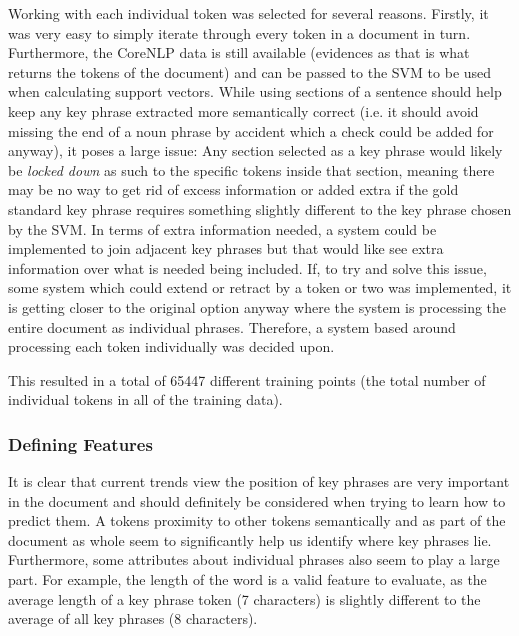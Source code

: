 Working with each individual token was selected for several reasons. Firstly, it was very easy to simply iterate through every token in a document in turn. Furthermore, the CoreNLP data is still available (evidences as that is what returns the tokens of the document) and can be passed to the SVM to be used when calculating support vectors. While using sections of a sentence should help keep any key phrase extracted more semantically correct (i.e. it should avoid missing the end of a noun phrase by accident which a check could be added for anyway), it poses a large issue: Any section selected as a key phrase would likely be \textit{locked down} as such to the specific tokens inside that section, meaning there may be no way to get rid of excess information or added extra if the gold standard key phrase requires something slightly different to the key phrase chosen by the SVM. In terms of extra information needed, a system could be implemented to join adjacent key phrases but that would like see extra information over what is needed being included. If, to try and solve this issue, some system which could extend or retract by a token or two was implemented, it is getting closer to the original option anyway where the system is processing the entire document as individual phrases. Therefore, a system based around processing each token individually was decided upon.

This resulted in a total of 65447 different training points (the total number of individual tokens in all of the training data).

\subsubsection*{Defining Features}
It is clear that current trends view the position of key phrases are very important in the document and should definitely be considered when trying to learn how to predict them. A tokens proximity to other tokens semantically and as part of the document as whole seem to significantly help us identify where key phrases lie. Furthermore, some attributes about individual phrases also seem to play a large part. For example, the length of the word is a valid feature to evaluate, as the average length of a key phrase token (7 characters) is slightly different to the average of all key phrases (8 characters). 

